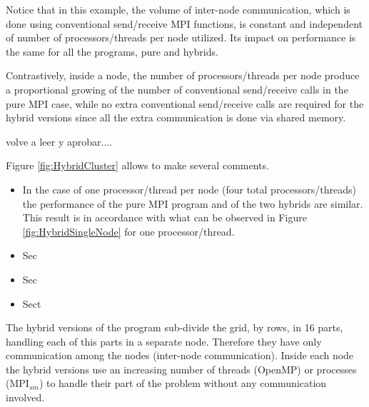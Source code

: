 \medskip

Notice that in this example, the volume of inter-node communication, which is done using conventional send/receive MPI functions, is constant and independent of number of processors/threads per node utilized. Its impact on performance is the same for all the programs, pure and hybrids.

Contrastively, inside a node, the number of processors/threads per node produce a proportional growing of the number of conventional send/receive calls in the pure MPI case, while no extra conventional send/receive calls are required for the hybrid versions since all the extra communication is done via shared memory.

volve a leer y aprobar....



\medskip



\medskip

Figure \ref{fig:HybridCluster} allows to make several comments. 


\begin{itemize} 
\item In the case of one processor/thread per node (four total processors/threads) the performance of the pure MPI program and of the two hybrids are similar. This result is in accordance with what can be observed in Figure \ref{fig:HybridSingleNode} for one processor/thread.

\item Sec

\item Sec

\item Sect



\end{itemize}



The hybrid versions of the program sub-divide the grid, by rows, in 16 parts, handling each of this parts in a separate node. Therefore they have only communication among the nodes (inter-node communication). Inside each node the hybrid versions use an increasing number of threads (OpenMP) or processes (MPI$_{sm}$) to handle their part of the problem without any communication involved.

